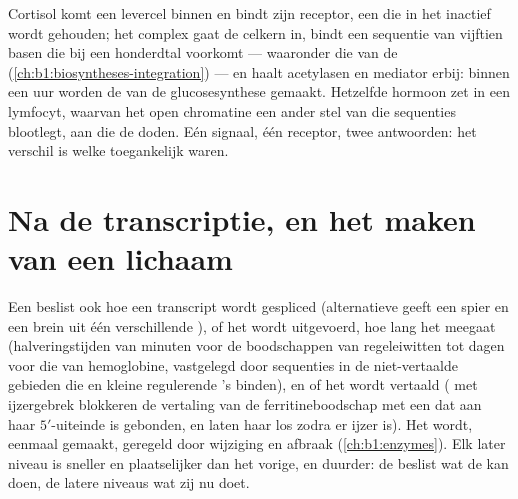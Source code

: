 \begin{example}\label{ex:b1:expression-control:steroid}
Cortisol komt een levercel binnen en bindt zijn receptor, een 
die in het  inactief wordt gehouden; het complex gaat de celkern in, bindt
een sequentie van vijftien basen die bij een honderdtal  voorkomt --- waaronder
die van de  (\cref{ch:b1:biosyntheses-integration}) --- en haalt
acetylasen en mediator erbij: binnen een uur worden de  van de
glucosesynthese gemaakt. Hetzelfde hormoon zet in een lymfocyt, waarvan het open
chromatine een ander stel van die sequenties blootlegt,  aan die de  doden.
Eén signaal, één receptor, twee antwoorden: het verschil is welke 
toegankelijk waren.
\end{example}

\section{Na de transcriptie, en het maken van een lichaam}

\begin{proposition}\label{prop:b1:expression-control:posttranscriptional}
Een  beslist ook hoe een transcript wordt gespliced (alternatieve
 geeft een spier en een brein uit één  verschillende ), of het
wordt uitgevoerd, hoe lang het meegaat (halveringstijden van minuten voor de
boodschappen van regeleiwitten tot dagen voor die van hemoglobine, vastgelegd door
sequenties in de niet-vertaalde gebieden die  en kleine regulerende 's
binden), en of het wordt vertaald ( met ijzergebrek blokkeren de vertaling
van de ferritineboodschap met een  dat aan haar $5'$-uiteinde is gebonden, en
laten haar los zodra er ijzer is). Het  wordt, eenmaal gemaakt, geregeld door
wijziging en afbraak (\cref{ch:b1:enzymes}). Elk later niveau is sneller en
plaatselijker dan het vorige, en duurder: de  beslist wat de  kan
doen, de latere niveaus wat zij nu doet.
\end{proposition}

